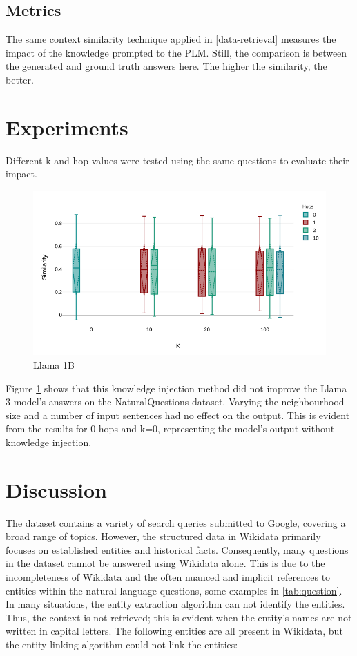 \documentclass{article}
\begin{document}
\subsection{Metrics}

The same context similarity technique applied in \ref{data-retrieval} measures the impact of the knowledge prompted to the PLM. Still, the comparison is between the generated and ground truth answers here. The higher the similarity, the better.

\section{Experiments}

Different k and hop values were tested using the same questions to evaluate their impact.

\begin{figure}[h]
    \centering
    \includegraphics[width=1\linewidth]{results_llama1b.png}
    \caption{Llama 1B}
    \label{fig:results_llama1b}
\end{figure}

Figure \ref{fig:results_llama1b} shows that this knowledge injection method did not improve the Llama 3 model's answers on the NaturalQuestions dataset. Varying the neighbourhood size and a number of input sentences had no effect on the output. This is evident from the results for 0 hops and k=0, representing the model's output without knowledge injection.

\section{Discussion}

The dataset contains a variety of search queries submitted to Google, covering a broad range of topics. However, the structured data in Wikidata primarily focuses on established entities and historical facts. Consequently, many questions in the dataset cannot be answered using Wikidata alone. This is due to the incompleteness of Wikidata and the often nuanced and implicit references to entities within the natural language questions, some examples in \ref{tab:question}. In many situations, the entity extraction algorithm can not identify the entities. Thus, the context is not retrieved; this is evident when the entity's names are not written in capital letters. The following entities are all present in Wikidata, but the entity linking algorithm could not link the entities:
\end{document}
